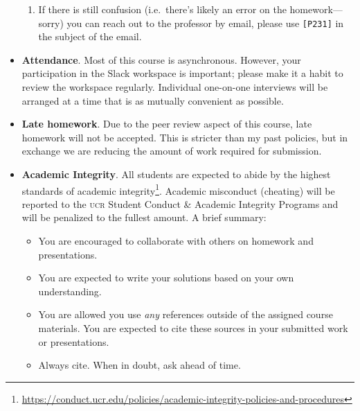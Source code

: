 \documentclass[12pt]{article}
\numberwithin{equation}{section}    %
\begin{document}
\begin{itemize}
\begin{enumerate}
		\item If there is still confusion (i.e.~there's likely an error on the homework---sorry) you can reach out to the professor by email, please use \texttt{[P231]} in the subject of the email.
	\end{enumerate}
	\item \textbf{Attendance}. Most of this course is asynchronous. However, your participation in the Slack workspace is important; please make it a habit to review the workspace regularly. Individual one-on-one interviews will be arranged at a time that is as mutually convenient as possible.
	\item \textbf{Late homework}. Due to the peer review aspect of this course, late homework will not be accepted. This is stricter than my past policies, but in exchange we are reducing the amount of work required for submission.
	\item \textbf{Academic Integrity}. All students are expected to abide by the highest standards of academic integrity\footnote{\url{https://conduct.ucr.edu/policies/academic-integrity-policies-and-procedures}}. Academic misconduct (cheating) will be reported to the \textsc{ucr} Student Conduct \& Academic Integrity Programs and will be penalized to the fullest amount. A brief summary:
	\begin{itemize}
		\item You are encouraged to collaborate with others on homework and presentations. 
		\item You are expected to write your solutions based on your own understanding.
		\item You are allowed you use \emph{any} references outside of the assigned course materials. You are expected to cite these sources in your submitted work or presentations.
		\item Always cite. When in doubt, ask ahead of time.
	\end{itemize}

\end{itemize}
\end{document}
